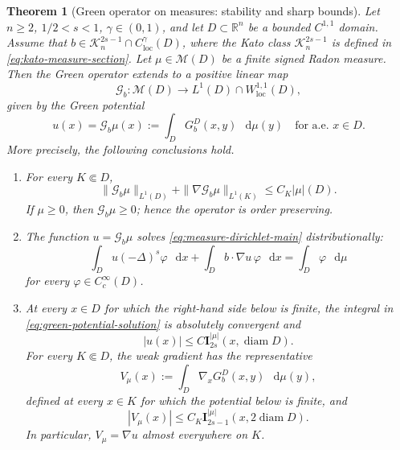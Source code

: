 \documentclass[reqno]{amsart}
\numberwithin{equation}{section}
\theoremstyle{plain}
\newtheorem{theorem}{Theorem}[section]
\theoremstyle{definition}
\theoremstyle{remark}
\newcommand{\R}{\mathbb R}
\newcommand{\M}{\mathcal M}
\newcommand{\I}{\mathbf I}
\newcommand{\differential}{\mathop{}\!\mathrm d}
\newcommand{\rev}[1]{#1}
\begin{document}
\begin{theorem}[\rev{Green operator on measures: stability and sharp bounds}]
\label{thm:measure-potential}
Let $n\ge2$, $1/2<s<1$, $\gamma\in(0,1)$, and let
$D\subset\R^n$ be a bounded $C^{1,1}$ domain.  Assume that
$b\in\mathcal K_n^{2s-1}\cap C^\gamma_{\mathrm{loc}}(D)$, where the Kato
class $\mathcal K_n^{2s-1}$ is defined in
\eqref{eq:kato-measure-section}.  Let
$\mu\in\M(D)$ be a finite signed Radon measure.
\begingroup
\rev{Then the Green
operator extends to a positive linear map}
\[
 \mathcal G_b:\M(D)\longrightarrow
 L^1(D)\cap W^{1,1}_{\mathrm{loc}}(D),
\]
\rev{given by the Green potential}
\begin{equation}\label{eq:green-potential-solution}
 u(x)=\mathcal G_b\mu(x):=\int_DG_b^D(x,y)\,\differential\mu(y)
 \quad\text{for a.e. }x\in D.
\end{equation}
\rev{More precisely, the following conclusions hold.}
\begin{enumerate}
\item \rev{For every $K\Subset D$,}
\begin{equation}\label{eq:green-measure-operator-bound}
 \|\mathcal G_b\mu\|_{L^1(D)}
 +\|\nabla\mathcal G_b\mu\|_{L^1(K)}
 \le C_K|\mu|(D).
\end{equation}
\rev{If $\mu\ge0$, then $\mathcal G_b\mu\ge0$; hence the operator is
order preserving.}

\item \rev{The function $u=\mathcal G_b\mu$ solves
\eqref{eq:measure-dirichlet-main} distributionally:}
\begin{equation}\label{eq:measure-distributional}
 \int_D u(-\Delta)^s\varphi\,\differential x
 +\int_D b\cdot\nabla u\,\varphi\,\differential x
 =\int_D\varphi\,\differential\mu
\end{equation}
for every $\varphi\in C_c^\infty(D)$.

\item \rev{At every $x\in D$ for which the right-hand side below is
finite, the integral in \eqref{eq:green-potential-solution} is absolutely
convergent and}
\begin{equation}\label{eq:u-potential-bound}
 |u(x)|\le C\I_{2s}^{|\mu|}(x,\operatorname{diam}D).
\end{equation}
\rev{For every $K\Subset D$, the weak gradient has the representative}
\begin{equation}\label{eq:green-potential-gradient}
 V_\mu(x):=\int_D\nabla_xG_b^D(x,y)\,\differential\mu(y),
\end{equation}
\rev{defined at every $x\in K$ for which the potential below is finite,
and}
\begin{equation}\label{eq:gradient-potential-bound}
 |V_\mu(x)|\le C_K\I_{2s-1}^{|\mu|}
 (x,2\operatorname{diam}D).
\end{equation}
\rev{In particular, $V_\mu=\nabla u$ almost everywhere on $K$.}


\end{enumerate}
\end{theorem}
\end{document}
